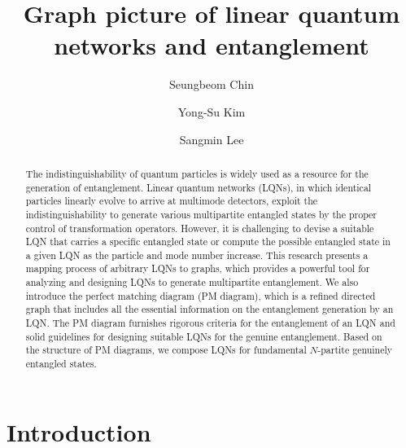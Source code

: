 \documentclass[a4paper,twocolumn,8pt,accepted=2021-12-15]{quantumarticle}
\begin{document}
\title{Graph picture of linear quantum networks and entanglement}

	\author{Seungbeom Chin }
	
	
	\author{Yong-Su Kim }
	
	\author{Sangmin Lee}


\maketitle

\begin{abstract}
		The indistinguishability of quantum particles is widely used as a resource for the generation of entanglement. Linear quantum networks (LQNs), in which identical particles linearly evolve to arrive at multimode detectors, exploit the indistinguishability to generate various multipartite entangled states by the proper control of transformation operators. However, it is challenging to devise a suitable LQN that carries a specific entangled state or compute the possible entangled state in a given LQN as the particle and mode number increase. This research presents a mapping process of arbitrary LQNs to graphs, which provides a powerful tool for analyzing and designing LQNs to generate multipartite entanglement. We also introduce the perfect matching diagram (PM diagram), which is a refined directed graph that includes all the essential information on the entanglement generation by an LQN. The PM diagram furnishes rigorous criteria for the entanglement of an LQN and solid guidelines for designing suitable LQNs for the genuine entanglement. Based on the structure of PM diagrams, we compose LQNs for fundamental $N$-partite genuinely entangled states.
\end{abstract}

	
	\section{Introduction} \label{intro}
	
\end{document}
